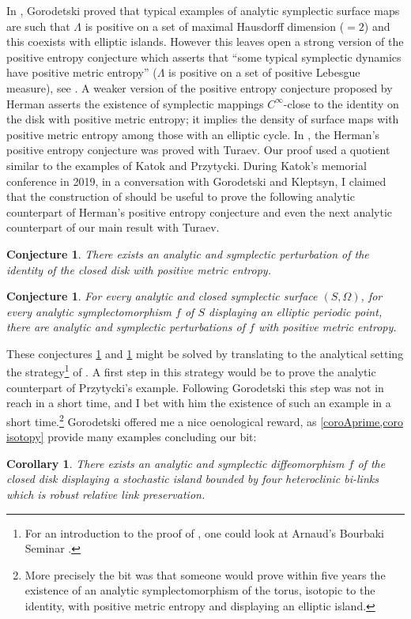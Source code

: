 \documentclass[JEP,XML,SOM,Unicode,NoFloatCountersInSection,Unicode,published]{cedram}
\newtheorem{conjecture}[proposition]{Conjecture}
\newtheorem{corollary}[theo]{Corollary}
\theoremstyle{definition}
\begin{document}
In \cite{Go12}, Gorodetski proved that typical examples of analytic symplectic surface maps are such that $\Lambda$ is positive on a set of maximal Hausdorff dimension ($= 2$) and this coexists with elliptic islands. However this leaves open a strong version of the positive entropy conjecture which asserts that ``some typical symplectic dynamics have positive metric entropy'' ($\Lambda$ is positive on a set of positive Lebesgue measure), see \eg \cite[p.\,144]{Si94}. A weaker version of the positive entropy conjecture proposed by Herman \cite{He98} asserts the existence of symplectic mappings $C^\infty$-close to the identity on the disk with positive metric entropy; it implies the density of surface maps with positive metric entropy among those with an elliptic cycle. In \cite{BT19}, the Herman's positive entropy conjecture was proved with Turaev. Our proof used a quotient similar to the examples of Katok and Przytycki. During Katok's memorial conference in 2019, in a conversation with Gorodetski and Kleptsyn, I claimed that the construction of \cite{BT19} should be useful to prove the following analytic counterpart of Herman's positive entropy conjecture \cite{He98} and even the next analytic counterpart of our main result with Turaev.

\begin{conjecture}\label{HeConj}
There exists an analytic and symplectic perturbation of the identity of the closed disk with positive metric entropy.
\end{conjecture}

\begin{conjecture}\label{main2sd}
For every analytic and closed symplectic surface $(S,\Omega)$, for every analytic symplectomorphism $f$ of $S$ displaying an elliptic periodic point, there are analytic and symplectic perturbations of $f$ with positive metric entropy.
\end{conjecture}
These conjectures \ref{HeConj} and \ref{main2sd} might be solved by translating to the analytical setting the strategy\footnote{For an introduction to the proof of \cite{BT19}, one could look at Arnaud's Bourbaki Seminar \cite{Ar19}.} of \cite{BT19}. A first step in this strategy would be to prove the analytic counterpart of Przytycki's example. Following Gorodetski this step was not in reach in a short time, and I bet with him the
existence of such an example in a short time.\footnote{More precisely the bit was that someone would prove within five years the existence of an analytic symplectomorphism of the torus, isotopic to the identity, with positive metric entropy and displaying an elliptic island.} Gorodetski offered me a nice oenological reward, as \cref{coroAprime,coro isotopy} provide many examples concluding our bit:
\begin{corollary}\label{coroAprime}
There exists an analytic and symplectic diffeomorphism $f$ of the closed disk displaying a stochastic island bounded by four heteroclinic bi-links which is robust relative link preservation. \end{corollary}
\end{document}
